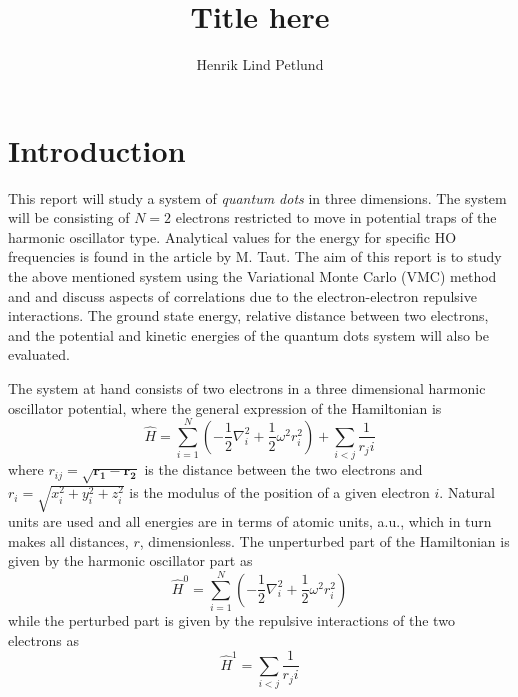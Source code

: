 \documentclass[12pt,english,a4paper]{article}
\title{Title here}
\author{Henrik Lind Petlund}
\begin{document}
\begin{titlepage}
\maketitle
\begin{abstract}

\newpage

\end{abstract}
\tableofcontents
\end{titlepage}

\section{Introduction} \label{introduction}

This report will study a system of \textit{quantum dots} in three dimensions. The system will be consisting of $N=2$ electrons restricted to move in potential traps of the harmonic oscillator type. Analytical values for the energy for specific HO frequencies is found in the article \cite{Taut} by M. Taut. The aim of this report is to study the above mentioned system using the Variational Monte Carlo (VMC) method and and discuss aspects of correlations due to the electron-electron repulsive interactions. The ground state energy, relative distance between two electrons, and the potential and kinetic energies of the quantum dots system will also be evaluated.

The system at hand consists of two electrons in a three dimensional harmonic oscillator potential, where the general expression of the Hamiltonian is
\begin{equation}
    \hat H = \sum_{i=1}^N \left(-\frac{1}{2}\nabla_i^2 +\frac{1}{2}\omega^2r_i^2\right)+\sum_{i<j}\frac{1}{r_ji}
    \label{eq:hamiltonian_total}
\end{equation}
where $r_{ij}=\sqrt{\boldsymbol{r_1}-\boldsymbol{r_2}}$ is the distance between the two electrons and $r_i=\sqrt{x_i^2+y_i^2+z_i^2}$ is the modulus of the position of a given electron $i$. Natural units are used and all energies are in terms of atomic units, a.u., which in turn makes all distances, $r$, dimensionless. The unperturbed part of the Hamiltonian is given by the harmonic oscillator part as
\begin{equation}
    \hat H^0 = \sum_{i=1}^N \left(-\frac{1}{2}\nabla_i^2 +\frac{1}{2}\omega^2r_i^2\right)
    \label{eq:hamiltonian_unperturbed}
\end{equation}
while the perturbed part is given by the repulsive interactions of the two electrons as
\begin{equation}
    \hat H^1 = \sum_{i<j}\frac{1}{r_ji}
    \label{eq:hamiltonian_perturbed}
\end{equation}
\end{document}
